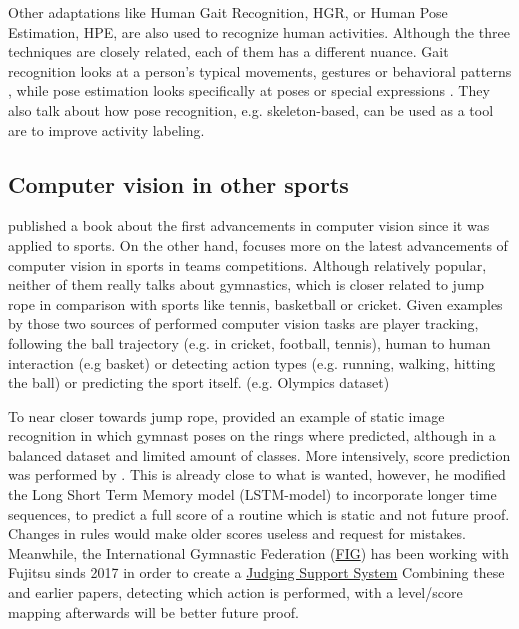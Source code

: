 Other adaptations like Human Gait Recognition, HGR, or Human Pose Estimation, HPE, are also used to recognize human activities. Although the three techniques are closely related, each of them has a different nuance. Gait recognition looks at a person's typical movements, gestures or behavioral patterns \autocite{Alharthi_2019}, while pose estimation looks specifically at poses or special expressions \autocite{Song_2021}. They also talk about how pose recognition, e.g. skeleton-based, can be used as a tool are to improve activity labeling.

\subsection{Computer vision in other sports}
\label{subsubsec:bp-literature-computer-vision-sports}

\textcite{Soomro_2014} published a book about the first advancements in computer vision since it was applied to sports. On the other hand, \textcite{Yin_2024} focuses more on the latest advancements of computer vision in sports in teams competitions. Although relatively popular, neither of them really talks about gymnastics, which is closer related to jump rope in comparison with sports like tennis, basketball or cricket.
Given examples by those two sources of performed computer vision tasks are player tracking, following the ball trajectory (e.g. in cricket, football, tennis), human to human interaction (e.g basket) or detecting action types (e.g. running, walking, hitting the ball) or predicting the sport itself. (e.g. Olympics dataset)

To near closer towards jump rope, \textcite{Abdullah_2023} provided an example of static image recognition in which gymnast poses on the rings where predicted, although in a balanced dataset and limited amount of classes. More intensively, score prediction was performed by \textcite{Zahan_2023}. This is already close to what is wanted, however, he modified the Long Short Term Memory model (LSTM-model) to incorporate longer time sequences, to predict a full score of a routine which is static and not future proof. Changes in rules would make older scores useless and request for mistakes.
Meanwhile, the International Gymnastic Federation (\href{https://www.gymnastics.sport/site/}{FIG}) has been working with Fujitsu sinds 2017 in order to create a \href{https://www.fujitsu.com/global/themes/data-driven/judging-support-system/}{Judging Support System}
Combining these and earlier papers, detecting which action is performed, with a level/score mapping afterwards will be better future proof.

